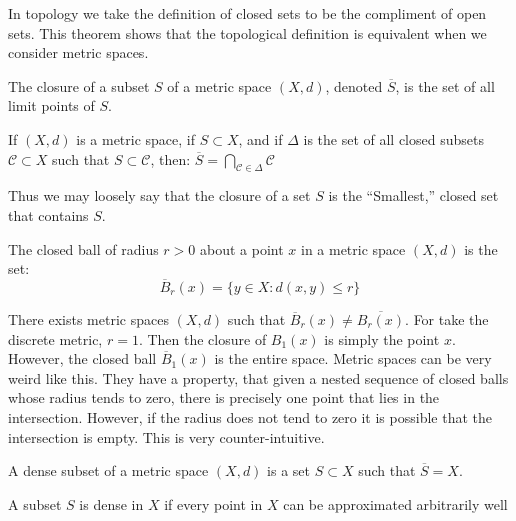        In topology we take the definition of
        closed sets to be the compliment of open
        sets. This theorem shows that the
        topological definition is equivalent when we
        consider metric spaces.
        \begin{definition}
            The closure of a subset
            $S$ of a metric space
            $(X,d)$, denoted $\overline{S}$,
            is the set of all
            limit points of $S$.
        \end{definition}
        \begin{theorem}
            If $(X,d)$ is a metric space, if
            $S\subset{X}$, and if
            $\Delta$ is the set of all closed subsets
            $\mathcal{C}\subset{X}$ such that
            $S\subset\mathcal{C}$, then:
            $\overline{S}=
             \bigcap_{\mathcal{C}\in\Delta}
             \mathcal{C}$
        \end{theorem}
        Thus we may loosely say that
        the closure of a set $S$ is the
        ``Smallest,'' closed set that contains $S$.
        \begin{definition}
            The closed ball of radius $r>0$ about
            a point $x$ in a metric space
            $(X,d)$ is the set:
            \begin{equation*}
                \overline{B}_{r}(x)=
                \{y\in{X}:d(x,y)\leq{r}\}
            \end{equation*}
        \end{definition}
        There exists metric spaces $(X,d)$
        such that
        $\overline{B}_{r}(x)\ne\overline{B_{r}(x)}$.
        For take the discrete metric, $r=1$.
        Then the closure of $B_{1}(x)$ is simply
        the point $x$. However, the closed ball
        $\overline{B}_{1}(x)$ is the entire space.
        Metric spaces can be very weird like this.
        They have a property, that given a nested
        sequence of closed balls whose radius
        tends to zero, there is precisely one
        point that lies in the intersection. However,
        if the radius does not tend to zero it is
        possible that the intersection is empty.
        This is very counter-intuitive.
        \begin{definition}
            A dense subset of a metric space $(X,d)$
            is a set $S\subset{X}$ such that
            $\overline{S}=X$.
        \end{definition}
        A subset $S$ is dense in $X$ if every point
        in $X$ can be approximated arbitrarily well
